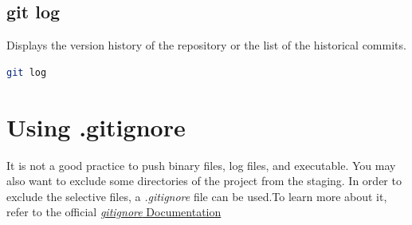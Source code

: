 \documentclass[letterpaper]{article}
\begin{document}
\subsection{git log}
Displays the version history of the repository or the list of the historical commits. 
\begin{lstlisting}[language=Bash]
git log
\end{lstlisting}

\section{Using .gitignore}
It is not a good practice to push binary files, log files, and executable. You may also want to exclude some directories of the project from the staging. In order to exclude the selective files, a \textit{.gitignore} file can be used.To learn more about it,  refer to the official \href{https://git-scm.com/docs/gitignore}{\textit{gitignore} Documentation}
\end{document}
